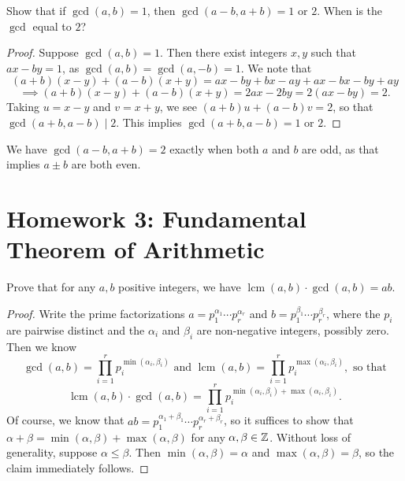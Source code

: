 \documentclass{article}
\DeclareMathOperator{\lcm}{lcm}
\begin{document}
\newpage
\begin{exercise}
Show that if $\gcd(a,b) = 1$, then $\gcd(a-b, a+b)=1$ or $2$. When is the $\gcd$ equal to $2$?
\end{exercise}
\begin{proof}
Suppose $\gcd(a,b) = 1$. Then there exist integers $x,y$ such that $ax-by = 1$, as $\gcd(a,b) = \gcd(a,-b) = 1$. We note that
$$(a+b)(x-y) + (a-b)(x+y) = ax - by + bx - ay + ax - bx- by + ay$$
$$\implies (a+b)(x-y)+(a-b)(x+y) = 2ax-2by = 2(ax - by) = 2.$$
Taking $u = x-y$ and $v = x+y$, we see $(a+b)u + (a-b)v = 2$, so that $\gcd(a+b, a-b) \mid 2$. This implies $\gcd(a+b, a-b) = 1$ or $2$.
\end{proof}
We have $\gcd(a-b, a+b)=2$ exactly when both $a$ and $b$ are odd, as that implies $a\pm b$ are both even.

\section*{Homework 3: Fundamental Theorem of Arithmetic}
\begin{exercise}
Prove that for any $a,b$ positive integers, we have $\lcm(a,b) \cdot \gcd(a,b) = ab$.
\end{exercise}
\begin{proof}
Write the prime factorizations $a = p_1^{\alpha_1}\cdots p_r^{\alpha_r}$ and $b = p_1^{\beta_1}\cdots p_r^{\beta_r}$, where the $p_i$ are pairwise distinct and the $\alpha_i$ and $\beta_i$ are non-negative integers, possibly zero. Then we know
$$\gcd(a, b) = \prod_{i=1}^r p_i^{\min(\alpha_i, \beta_i)} \text{ and } \lcm(a, b) = \prod_{i=1}^r p_i^{\max(\alpha_i, \beta_i)}, \text{ so that}$$
$$\lcm(a, b)\cdot \gcd(a, b) = \prod_{i=1}^r p_i^{\min(\alpha_i, \beta_i) + \max(\alpha_i, \beta_i)}.$$
Of course, we know that $ab = p_1^{\alpha_1+\beta_1}\cdots p_r^{\alpha_r+\beta_r}$, so it suffices to show that $\alpha + \beta = \min(\alpha, \beta) + \max(\alpha, \beta)$ for any $\alpha,\beta \in \mathbb Z$. Without loss of generality, suppose $\alpha \leq \beta$. Then $\min(\alpha,\beta) = \alpha$ and $\max(\alpha, \beta) = \beta$, so the claim immediately follows.
\end{proof}
\end{document}
